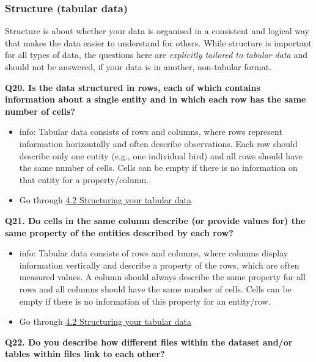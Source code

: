 \documentclass[
  oneside]{book}
\providecommand{\tightlist}{%
  \setlength{\itemsep}{0pt}\setlength{\parskip}{0pt}}
\begin{document}
\subsubsection*{Structure (tabular data)}\label{structure-tabular-data}

Structure is about whether your data is organised in a consistent and logical way that makes the data easier to understand for others. While structure is important for all types of data, the questions here are \emph{explicitly tailored to tabular data} and should not be answered, if your data is in another, non-tabular format.

\textbf{Q20. Is the data structured in rows, each of which contains information about a single entity and in which each row has the same number of cells?}

\begin{itemize}
\tightlist
\item
  info: Tabular data consists of rows and columns, where rows represent information horizontally and often describe observations. Each row should describe only one entity (e.g., one individual bird) and all rows should have the same number of cells. Cells can be empty if there is no information on that entity for a property/column.
\item
  Go through \hyperref[structuring-your-tabular-data]{4.2 Structuring your tabular data}
\end{itemize}

\textbf{Q21. Do cells in the same column describe (or provide values for) the same property of the entities described by each row?}

\begin{itemize}
\tightlist
\item
  info: Tabular data consists of rows and columns, where columns display information vertically and describe a property of the rows, which are often measured values. A column should always describe the same property for all rows and all columns should have the same number of cells. Cells can be empty if there is no information of this property for an entity/row.
\item
  Go through \hyperref[structuring-your-tabular-data]{4.2 Structuring your tabular data}
\end{itemize}

\textbf{Q22. Do you describe how different files within the dataset and/or tables within files link to each other?}
\end{document}
